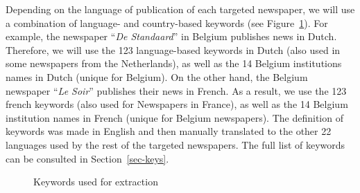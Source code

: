 \documentclass[
]{agujournal2019}
\begin{document}
Depending on the language of publication of each targeted newspaper, we
will use a combination of language- and country-based keywords (see
Figure~\ref{fig-keywords}). For example, the newspaper ``\emph{De
Standaard}'' in Belgium publishes news in Dutch. Therefore, we will use
the 123 language-based keywords in Dutch (also used in some newspapers
from the Netherlands), as well as the 14 Belgium institutions names in
Dutch (unique for Belgium). On the other hand, the Belgium newspaper
``\emph{Le Soir}'' publishes their news in French. As a result, we use
the 123 french keywords (also used for Newspapers in France), as well as
the 14 Belgium institution names in French (unique for Belgium
newspapers). The definition of keywords was made in English and then
manually translated to the other 22 languages used by the rest of the
targeted newspapers. The full list of keywords can be
consulted in Section~\ref{sec-keys}.

\begin{figure}

\caption{\label{fig-keywords}Keywords used for extraction}


\end{figure}%
\end{document}
